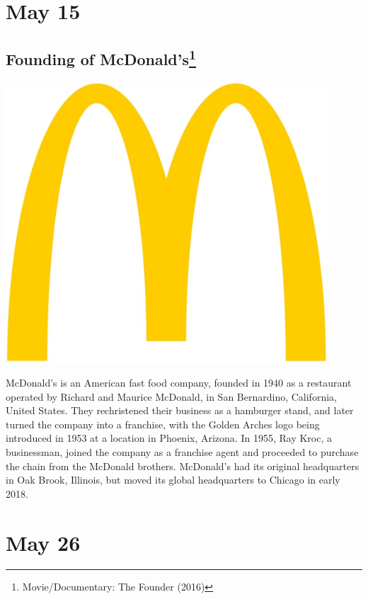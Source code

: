 \documentclass[11pt]{report}
\begin{document}
\section{May 15}
\subsection{Founding of McDonald's\protect\footnote{Movie/Documentary: The Founder (2016)}}
\vspace{2mm}\begin{center}\includegraphics[width=12cm]{./img/mcdonaldsLogo.jpg}\end{center}
McDonald's is an American fast food company, founded in 1940 as a restaurant operated by Richard and Maurice McDonald, in San Bernardino, California, United States. They rechristened their business as a hamburger stand, and later turned the company into a franchise, with the Golden Arches logo being introduced in 1953 at a location in Phoenix, Arizona. In 1955, Ray Kroc, a businessman, joined the company as a franchise agent and proceeded to purchase the chain from the McDonald brothers. McDonald's had its original headquarters in Oak Brook, Illinois, but moved its global headquarters to Chicago in early 2018.
\section{May 26}
\end{document}
